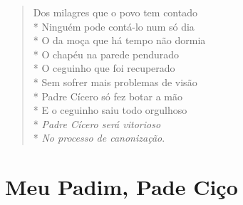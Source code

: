 \begin{verse}
Dos milagres que o povo tem contado\\*
Ninguém pode contá-lo num só dia\\*
O da moça que há tempo não dormia\\*
O chapéu na parede pendurado\\*
O ceguinho que foi recuperado\\*
Sem sofrer mais problemas de visão\\*
Padre Cícero só fez botar a mão\\*
E o ceguinho saiu todo orgulhoso\\*
\textit{Padre Cícero será vitorioso}\\*
\textit{No processo de canonização}.
\end{verse}


\chapter{Meu Padim, Pade Ciço}

